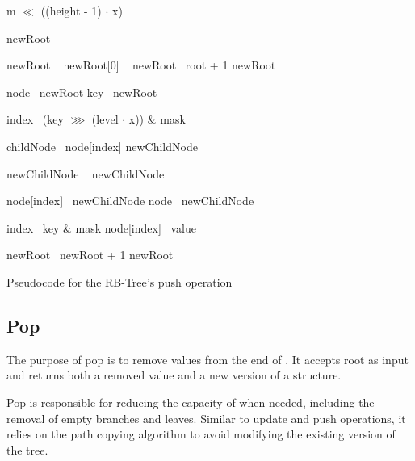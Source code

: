 \begin{listing}[ht!]
    \begin{algorithmic}[1]
		    \State \Return m $\ll$ ((height - 1) $\cdot$ x)
        \EndFunction

            \State newRoot \la\ \nil{}

                \State newRoot \la\ 
                \State newRoot[0] \la\ 
                \State newRoot \la\ root + 1
            \Else
                \State newRoot \la\ 
            \EndIf

            \State node \la\ newRoot
            \State key \la\ newRoot

                \State index \la\ (key $\ggg$ (level $\cdot$ x)) \& mask

                \State childNode \la\ node[index]
                \State newChildNode \la\ \nil{}

                    \State newChildNode \la\ 
                \Else
                    \State newChildNode \la\ 
                \EndIf

                \State node[index] \la\ newChildNode
                \State node \la\ newChildNode
            \EndFor

            \State index \la\ key \& mask
            \State node[index] \la\ value

            \State newRoot \la\ newRoot + 1
            \State \Return newRoot
        \EndFunction
    \end{algorithmic}

    \caption{Pseudocode for the RB-Tree's push operation}
    \label{lst:rb-tree-push}
\end{listing}

\subsection{Pop}
The purpose of pop is to remove values from the end of \treerb{}. It accepts root as input and returns both a removed value and a new version of a structure.

Pop is responsible for reducing the capacity of \treerb{} when needed, including the removal of empty branches and leaves. Similar to update and push operations, it relies on the path copying algorithm to avoid modifying the existing version of the tree.

